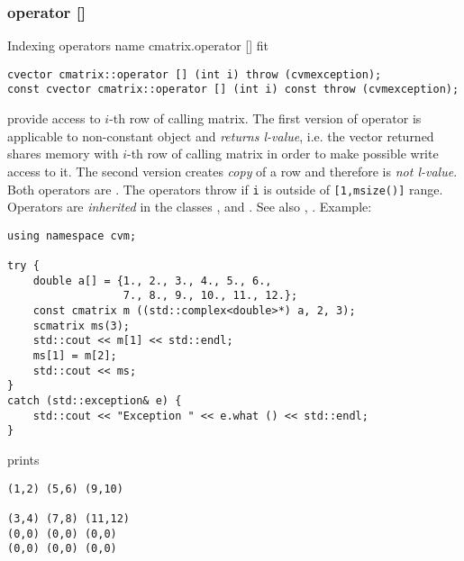 \subsubsection{operator []}
Indexing operators%
\pdfdest name {cmatrix.operator []} fit
\begin{verbatim}
cvector cmatrix::operator [] (int i) throw (cvmexception);
const cvector cmatrix::operator [] (int i) const throw (cvmexception);
\end{verbatim}
provide access to  \hbox{$i$-th} row of calling matrix. The first version
of operator is applicable to  non-constant object and
\emph{returns  l-value}, i.e. the vector returned shares memory
with \hbox{$i$-th} row of calling matrix
in order to make possible write access to it.
The second version creates  \emph{copy} of a row and therefore is
\emph{not  l-value}.
Both operators are \Based.
The operators throw 
if \verb"i" is outside of \verb"[1,msize()]" range.
Operators are \emph{inherited}
in the classes
,  
and .
See also ,
.
Example:
\begin{Verbatim}
using namespace cvm;

try {
    double a[] = {1., 2., 3., 4., 5., 6.,
                  7., 8., 9., 10., 11., 12.};
    const cmatrix m ((std::complex<double>*) a, 2, 3);
    scmatrix ms(3);
    std::cout << m[1] << std::endl;
    ms[1] = m[2];
    std::cout << ms;
}
catch (std::exception& e) {
    std::cout << "Exception " << e.what () << std::endl;
}
\end{Verbatim}
prints
\begin{Verbatim}
(1,2) (5,6) (9,10)

(3,4) (7,8) (11,12)
(0,0) (0,0) (0,0)
(0,0) (0,0) (0,0)
\end{Verbatim}
\newpage




